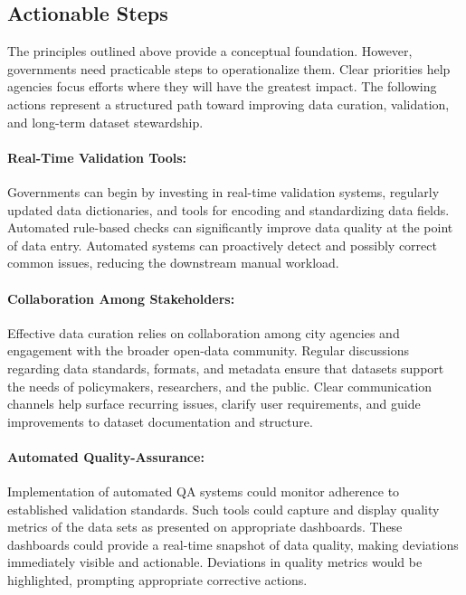 \documentclass[linenumber]{jdsart}
\begin{document}
\subsection{Actionable Steps}
\label{subsec:actions}

The principles outlined above provide a conceptual 
foundation. However, governments need practicable steps to 
operationalize them. Clear priorities help agencies focus 
efforts where they will have the greatest impact. The 
following actions represent a structured path toward 
improving data curation, validation, and long-term dataset stewardship.

\paragraph{Real-Time Validation Tools:}
\label{par:realtime}
Governments can begin by investing in real-time validation systems, 
regularly updated data dictionaries, and tools for encoding and 
standardizing data fields. Automated rule-based checks can 
significantly improve data quality at the point of 
data entry. Automated systems can proactively detect and possibly 
correct common issues, reducing the downstream manual workload.


\paragraph{Collaboration Among Stakeholders:}
\label{par:collaboration}
Effective data curation relies on collaboration among city 
agencies and engagement with the broader open-data community. Regular 
discussions regarding data standards, formats, and metadata ensure that 
datasets support the needs of policymakers, researchers, and 
the public. Clear communication channels help surface recurring 
issues, clarify user requirements, and guide improvements to dataset 
documentation and structure.

\paragraph{Automated Quality-Assurance:}
\label{par:qa}
Implementation of automated QA systems could monitor 
adherence to established validation standards. Such tools 
could capture and display quality metrics of the data sets as presented
on appropriate dashboards. These dashboards could provide 
a real-time snapshot of data quality, making deviations 
immediately visible and actionable. Deviations in quality metrics 
would be highlighted, prompting appropriate corrective actions.
\end{document}
